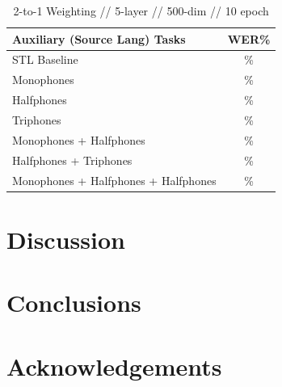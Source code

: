 \documentclass[a4paper]{article}
\begin{document}
\begin{table}[!htbp]
  \centering
    \caption{2-to-1 Weighting // 5-layer // 500-dim //  10 epoch }
  \begin{adjustbox}{width=.45\textwidth}
    \begin{tabular}{lc}
      \toprule
      \textbf{Auxiliary (Source Lang) Tasks} & \textbf{WER\%}\\
      \midrule
      STL Baseline &  \% \\
      Monophones &  \% \\
      Halfphones &  \% \\
      Triphones &  \%  \\
      Monophones + Halfphones & \%  \\
      Halfphones + Triphones & \%  \\
      Monophones + Halfphones + Halfphones & \%  \\
      \bottomrule
    \end{tabular}
    \label{table:data}
  \end{adjustbox}
\end{table}



\section{Discussion}


\section{Conclusions}

\section{Acknowledgements}






\end{document}
